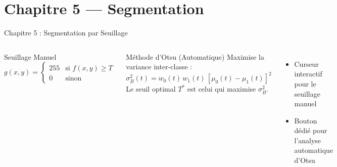 \documentclass[aspectratio=169, 11pt]{beamer}
\begin{document}
\section{Chapitre 5 — Segmentation}

\begin{frame}{Chapitre 5 : Segmentation par Seuillage}
  \begin{columns}[T]
    \begin{block}{Seuillage Manuel}
      \[ g(x,y) = \begin{cases} 255 & \text{si } f(x,y) \geq T \\ 0 & \text{sinon} \end{cases} \]
    \end{block}
    \vspace{4pt}
    \begin{block}{Méthode d'Otsu (Automatique)}
      Maximise la variance inter-classe :
      \[ \sigma_B^2(t) = w_0(t)\, w_1(t)\, [\mu_0(t) - \mu_1(t)]^2 \]
      Le seuil optimal $T^*$ est celui qui maximise $\sigma_B^2$.
    \end{block}
    \vspace{4pt}
    \begin{itemize}
      \item Curseur interactif pour le seuillage manuel
      \item Bouton dédié pour l'analyse automatique d'Otsu
    \end{itemize}

  \end{columns}
\end{frame}

\end{document}
